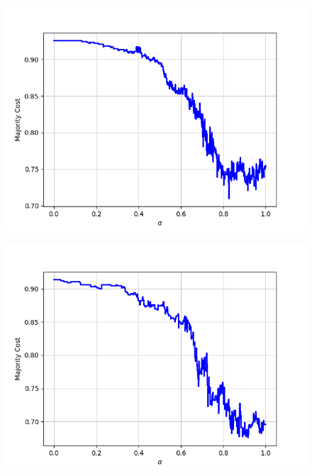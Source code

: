 \begin{figure}[H]
\begin{minipage}{.24\textwidth}
  {\includegraphics[width=\linewidth]{plots/omniglot-intra-sc/Malay_(Jawi_-_Arabic)}}
\end{minipage}
\begin{minipage}{.24\textwidth}
  \centering
  {\includegraphics[width=\linewidth]{plots/omniglot-intra-sc/Mkhedruli_(Georgian)}}
\end{minipage}
\begin{minipage}{.24\textwidth}
  \centering

\end{minipage}
\end{figure}
